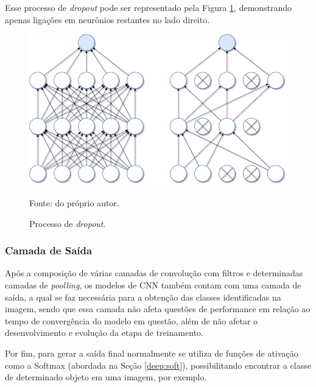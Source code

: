Esse processo de \textit{dropout} pode ser representado pela Figura \ref{deep:fig:9}, demonstrando apenas ligações em neurônios restantes no lado direito.

\begin{figure}[H]
    \centering
    \caption{Processo de \textit{dropout}.}
    \includegraphics[width=1\linewidth]{recursos/imagens/deep/dropout.png}
    \label{deep:fig:9}
    
    \vspace*{1 cm}
     Fonte: do próprio autor.
\end{figure}


\subsubsection{Camada de Saída}
\label{deep:output}

Após a composição de várias camadas de convolução com filtros e determinadas camadas de \textit{poolling}, os modelos de CNN também contam com uma camada de saída, a qual se faz necessária para a obtenção das classes identificadas na imagem, sendo que essa camada não afeta questões de performance em relação ao tempo de convergência do modelo em questão, além de não afetar o desenvolvimento e evolução da etapa de treinamento.

Por fim, para gerar a saída final normalmente se utiliza de funções de ativação como a Softmax (abordada na Seção \ref{deep:soft}), possibilitando encontrar a classe de determinado objeto em uma imagem, por exemplo.